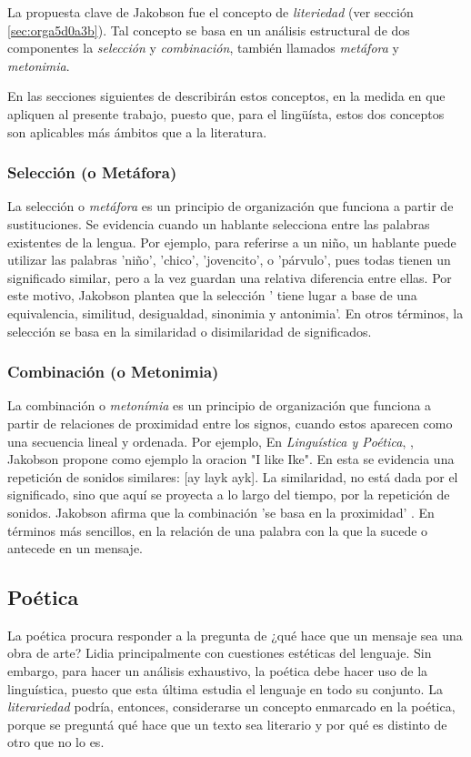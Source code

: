 \documentclass[12pt,letterpaper,twoside]{article}
\begin{document}
La propuesta clave de Jakobson fue el concepto de \emph{literiedad}
(ver sección \ref{sec:orga5d0a3b}). Tal concepto se basa en un análisis
estructural de dos componentes la \emph{selección} y \emph{combinación},
también llamados \emph{metáfora} y \emph{metonimia}.

En las secciones siguientes de describirán estos conceptos, en la
medida en que apliquen al presente trabajo, puesto que, para el
lingüísta, estos dos conceptos son aplicables más ámbitos que a la
literatura.


\subsubsection{Selección (o Metáfora)}
\label{sec:org008006f}

La selección o \emph{metáfora} es un principio de organización que
funciona a partir de  sustituciones. Se evidencia cuando un hablante
selecciona entre las palabras existentes de la lengua.  Por
ejemplo, para referirse a un niño, un hablante puede utilizar las
palabras 'niño', 'chico', 'jovencito', o 'párvulo', pues todas
tienen un significado similar, pero a la vez guardan una relativa
diferencia entre ellas.  Por este motivo, Jakobson
\cite[pg. 128]{jakobson1981linguistica} plantea que la selección '
tiene lugar a base de una equivalencia, similitud, desigualdad,
sinonimia y antonimia'. En otros términos, la selección se basa en
la similaridad o disimilaridad de significados.


\subsubsection{Combinación (o Metonimia)}
\label{sec:orgaadc163}

La combinación o \emph{metonímia} es un principio de organización que
funciona a partir de relaciones de proximidad entre los signos,
cuando estos aparecen como una secuencia lineal y ordenada. Por
ejemplo, En \emph{Linguística y Poética},
\cite{jakobson1981linguistica}, Jakobson propone como ejemplo la
oracion "I like Ike". En esta se evidencia una repetición de
sonidos similares: [ay layk ayk]. La similaridad, no está dada por
el significado, sino que aquí se proyecta a lo largo del tiempo,
por la repetición de sonidos. Jakobson afirma que la combinación
'se basa en la proximidad'
\cite[pg. 128]{jakobson1981linguistica}. En términos más sencillos,
en la relación de una palabra con la que la sucede o antecede en un
mensaje.

\subsection{Poética}
\label{sec:orgfe4217f}
La poética procura responder a la pregunta de ¿qué hace que un
mensaje sea una obra de arte? Lidia principalmente con cuestiones
estéticas del lenguaje. Sin embargo, para hacer un análisis
exhaustivo, la poética debe hacer uso de la linguística, puesto
que esta última estudia el lenguaje en todo su conjunto. La
\emph{literariedad} podría, entonces, considerarse un concepto
enmarcado en la poética, porque se preguntá qué hace que un texto
sea literario y por qué es distinto de otro que no lo es.
\end{document}
